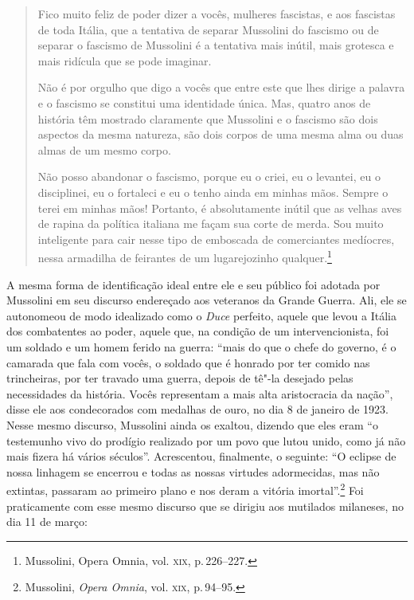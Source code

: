 \begin{quote}
Fico muito feliz de poder dizer a vocês, mulheres fascistas, e aos
fascistas de toda Itália, que a tentativa de separar Mussolini do
fascismo ou de separar o fascismo de Mussolini é a tentativa mais
inútil, mais grotesca e mais ridícula que se pode imaginar.

Não é por orgulho que digo a vocês que entre este que lhes dirige a
palavra e o fascismo se constitui uma identidade única. Mas, quatro anos
de história têm mostrado claramente que Mussolini e o fascismo são dois
aspectos da mesma natureza, são dois corpos de uma mesma alma ou duas
almas de um mesmo corpo.

Não posso abandonar o fascismo, porque eu o criei, eu o levantei, eu o
disciplinei, eu o fortaleci e eu o tenho ainda em minhas mãos. Sempre o
terei em minhas mãos! Portanto, é absolutamente inútil que as velhas
aves de rapina da política italiana me façam sua corte de merda. Sou
muito inteligente para cair nesse tipo de emboscada de comerciantes
medíocres, nessa armadilha de feirantes de um lugarejozinho qualquer.\footnote{Mussolini, Opera Omnia, vol. \textsc{xix}, p.\,226--227.}
\end{quote}

A mesma forma de identificação ideal entre ele e seu público foi adotada
por Mussolini em seu discurso endereçado aos veteranos da Grande Guerra.
Ali, ele se autonomeou de modo idealizado como o \emph{Duce} perfeito,
aquele que levou a Itália dos combatentes ao poder, aquele que, na
condição de um intervencionista, foi um soldado e um homem ferido na
guerra: ``mais do que o chefe do governo, é o camarada que fala com
vocês, o soldado que é honrado por ter comido nas trincheiras, por ter
travado uma guerra, depois de tê"-la desejado pelas necessidades da
história. Vocês representam a mais alta aristocracia da nação'', disse
ele aos condecorados com medalhas de ouro, no dia 8 de janeiro de 1923.
Nesse mesmo discurso, Mussolini ainda os exaltou, dizendo que eles eram
``o testemunho vivo do prodígio realizado por um povo que lutou unido,
como já não mais fizera há vários séculos''. Acrescentou, finalmente, o
seguinte: ``O eclipse de nossa linhagem se encerrou e todas as nossas
virtudes adormecidas, mas não extintas, passaram ao primeiro plano e nos
deram a vitória imortal''.\footnote{Mussolini, \emph{Opera Omnia}, vol.
  \textsc{xix}, p.\,94--95.} Foi praticamente com esse mesmo discurso que se
dirigiu aos mutilados milaneses, no dia 11 de março:


